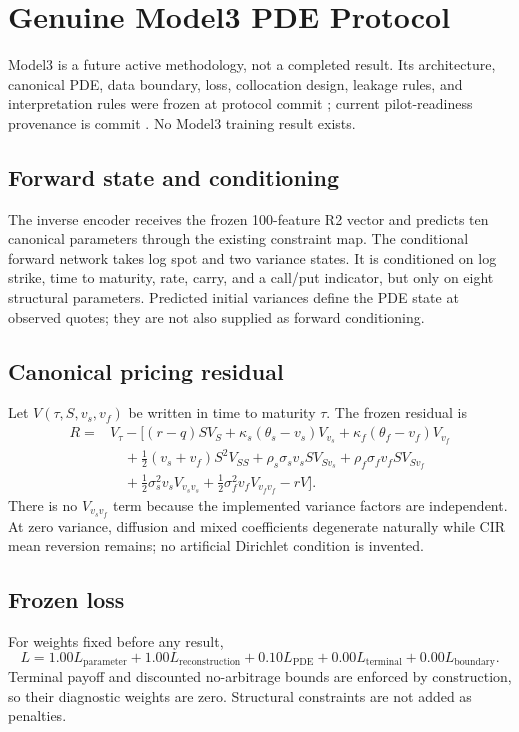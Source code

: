 \section{Genuine Model3 PDE Protocol}
\label{sec:model3-protocol}

Model3 is a future active methodology, not a completed result. Its architecture,
canonical PDE, data boundary, loss, collocation design, leakage rules, and
interpretation rules were frozen at protocol commit
; current pilot-readiness
provenance is commit
. No Model3 training
result exists.

\subsection{Forward state and conditioning}
The inverse encoder receives the frozen 100-feature R2 vector and predicts ten
canonical parameters through the existing constraint map. The conditional forward
network takes log spot and two variance states. It is conditioned on log strike,
time to maturity, rate, carry, and a call/put indicator, but only on eight structural
parameters. Predicted initial variances define the PDE state at observed quotes; they
are not also supplied as forward conditioning.

\subsection{Canonical pricing residual}
Let $V(\tau,S,v_s,v_f)$ be written in time to maturity $\tau$. The frozen residual is
\begin{align}
R ={}& V_\tau
- \Big[
      (r-q)SV_S
      + \kappa_s(\theta_s-v_s)V_{v_s}
      + \kappa_f(\theta_f-v_f)V_{v_f} \nonumber\\
&\quad
      + \tfrac12(v_s+v_f)S^2V_{SS}
      + \rho_s\sigma_sv_sSV_{Sv_s}
      + \rho_f\sigma_fv_fSV_{Sv_f} \nonumber\\
&\quad
      + \tfrac12\sigma_s^2v_sV_{v_sv_s}
      + \tfrac12\sigma_f^2v_fV_{v_fv_f}
      - rV
    \Big].
\label{eq:model3-pde}
\end{align}
There is no $V_{v_sv_f}$ term because the implemented variance factors are independent.
At zero variance, diffusion and mixed coefficients degenerate naturally while CIR mean
reversion remains; no artificial Dirichlet condition is invented.

\subsection{Frozen loss}
For weights fixed before any result,
\begin{equation}
L =
1.00L_{\mathrm{parameter}}
+1.00L_{\mathrm{reconstruction}}
+0.10L_{\mathrm{PDE}}
+0.00L_{\mathrm{terminal}}
+0.00L_{\mathrm{boundary}}.
\end{equation}
Terminal payoff and discounted no-arbitrage bounds are enforced by construction, so
their diagnostic weights are zero. Structural constraints are not added as penalties.

